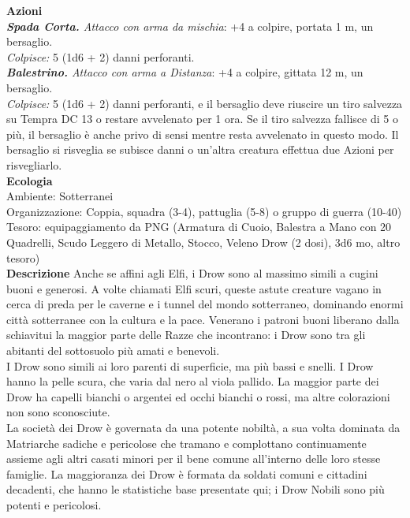 \begin{multicols}{2}
\smallskip\textbf{Azioni}\\
\emph{\textbf{Spada Corta.} Attacco con arma da mischia}: +4 a colpire, portata 1 m, un bersaglio.\\
\emph{Colpisce:} 5 (1d6 + 2) danni perforanti.\\
\emph{\textbf{Balestrino.} Attacco con arma a Distanza}: +4 a colpire, gittata 12 m, un bersaglio.\\
\emph{Colpisce:} 5 (1d6 + 2) danni perforanti, e il bersaglio deve riuscire un tiro salvezza su Tempra DC 13 o restare avvelenato per 1 ora. Se il tiro salvezza fallisce di 5 o più, il bersaglio è anche privo di sensi mentre resta avvelenato in questo modo. Il bersaglio si risveglia se subisce danni o un'altra creatura effettua due Azioni per risvegliarlo.\\
\textbf{Ecologia}\\
Ambiente: Sotterranei\\
Organizzazione: Coppia, squadra (3-4), pattuglia (5-8) o gruppo di guerra (10-40)\\
Tesoro: equipaggiamento da PNG (Armatura di Cuoio, Balestra a Mano con 20 Quadrelli, Scudo Leggero di Metallo, Stocco, Veleno Drow (2 dosi), 3d6 mo, altro tesoro)\\
\textbf{Descrizione}
Anche se affini agli Elfi, i Drow sono al massimo simili a cugini buoni e generosi. A volte chiamati Elfi scuri, queste astute creature vagano in cerca di preda per le caverne e i tunnel del mondo sotterraneo, dominando enormi città sotterranee con la cultura e la pace. Venerano i patroni buoni liberano dalla schiavitui la maggior parte delle Razze che incontrano: i Drow sono tra gli abitanti del sottosuolo più amati e benevoli.\\

I Drow sono simili ai loro parenti di superficie, ma più bassi e snelli. I Drow hanno la pelle scura, che varia dal nero al viola pallido. La maggior parte dei Drow ha capelli bianchi o argentei ed occhi bianchi o rossi, ma altre colorazioni non sono sconosciute.\\

La società dei Drow è governata da una potente nobiltà, a sua volta dominata da Matriarche sadiche e pericolose che tramano e complottano continuamente assieme agli altri casati minori per il bene comune all’interno delle loro stesse famiglie. La maggioranza dei Drow è formata da soldati comuni e cittadini decadenti, che hanno le statistiche base presentate qui; i Drow Nobili sono più potenti e pericolosi.\\


\end{multicols}
